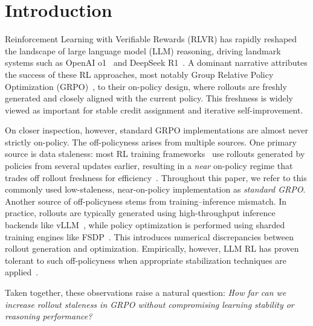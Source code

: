 \section{Introduction}
\label{sec:introduction}

Reinforcement Learning with Verifiable Rewards (RLVR) has rapidly reshaped the landscape of large language model (LLM) reasoning, driving landmark systems such as OpenAI o1~\citep{openai2024openaio1card} and DeepSeek R1~\citep{Guo_2025}. A dominant narrative attributes the success of these RL approaches, most notably Group Relative Policy Optimization (GRPO)~\citep{schulman2017proximalpolicyoptimizationalgorithms, shao2024deepseekmathpushinglimitsmathematical, yu2025dapoopensourcellmreinforcement}, to their on-policy design, where rollouts are freshly generated and closely aligned with the current policy. This freshness is widely viewed as important for stable credit assignment and iterative self-improvement.

On closer inspection, however, standard GRPO implementations are almost never strictly on-policy. The off-policyness arises from multiple sources. One primary source is data staleness: most RL training frameworks~\citep{sheng2025hybridflow, slime_github, noukhovitch2024asynchronous, zhong2025streamrl, he2025history} use rollouts generated by policies from several updates earlier, resulting in a \emph{near} on-policy regime that trades off rollout freshness for efficiency~\citep{huggingface_openr1_update3}. Throughout this paper, we refer to this commonly used low-staleness, near-on-policy implementation as \emph{standard GRPO}. Another source of off-policyness stems from training–inference mismatch. In practice, rollouts are typically generated using high-throughput inference backends like vLLM~\citep{kwon2023efficientmemorymanagementlarge}, while policy optimization is performed using sharded training engines like FSDP~\citep{zhao2023pytorchfsdpexperiencesscaling}. This introduces numerical discrepancies between rollout generation and optimization. Empirically, however, LLM RL has proven tolerant to such off-policyness when appropriate stabilization techniques are applied~\citep{liu-li-2025-rl-collapse,qi2025defeating}.




Taken together, these observations raise a natural question: \textit{How far can we increase rollout staleness in GRPO without compromising learning stability or reasoning performance?}


